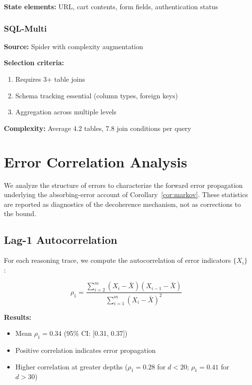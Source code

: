 \documentclass{article}
\theoremstyle{plain}
\theoremstyle{definition}
\theoremstyle{remark}
\begin{document}
\textbf{State elements:} URL, cart contents, form fields, authentication status

\subsubsection{SQL-Multi}

\textbf{Source:} Spider \citep{yu2018spider} with complexity augmentation

\textbf{Selection criteria:}
\begin{enumerate}
\item Requires 3+ table joins
\item Schema tracking essential (column types, foreign keys)
\item Aggregation across multiple levels
\end{enumerate}

\textbf{Complexity:} Average 4.2 tables, 7.8 join conditions per query


\section{Error Correlation Analysis}
\label{app:error_correlation}

We analyze the structure of errors to characterize the forward error propagation underlying the absorbing-error account of Corollary~\ref{cor:markov}. These statistics are reported as diagnostics of the decoherence mechanism, not as corrections to the bound.

\subsection{Lag-1 Autocorrelation}

For each reasoning trace, we compute the autocorrelation of error indicators $\{X_i\}$:

\begin{equation}
\rho_1 = \frac{\sum_{i=2}^{m} (X_i - \bar{X})(X_{i-1} - \bar{X})}{\sum_{i=1}^{m} (X_i - \bar{X})^2}
\end{equation}

\textbf{Results:}
\begin{itemize}
\item Mean $\rho_1 = 0.34$ (95\% CI: [0.31, 0.37])
\item Positive correlation indicates error propagation
\item Higher correlation at greater depths ($\rho_1 = 0.28$ for $d < 20$; $\rho_1 = 0.41$ for $d > 30$)
\end{itemize}
\end{document}
